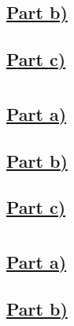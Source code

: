 \documentclass{article}
\begin{document}
\subsection*{\underline{Part b)}}

\subsection*{\underline{Part c)}}

\newpage
\section{}
\newpage
\section{}
\subsection*{\underline{Part a)}}

\subsection*{\underline{Part b)}}

\subsection*{\underline{Part c)}}

\newpage
\section{}
\subsection*{\underline{Part a)}}

\subsection*{\underline{Part b)}}

\newpage
\section{}

\newpage
\section{}
\end{document}
